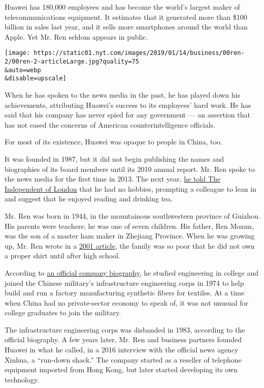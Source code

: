 Huawei has 180,000 employees and has become the world's largest maker of
telecommunications equipment. It estimates that it generated more than
\$100 billion in sales last year, and it sells more smartphones around
the world than Apple. Yet Mr. Ren seldom appears in public.

\texttt{[image: https://static01.nyt.com/images/2019/01/14/business/00ren-2/00ren-2-articleLarge.jpg?quality=75\\\&auto=webp\\\&disable=upscale]}

When he has spoken to the news media in the past, he has played down his
achievements, attributing Huawei's success to its employees' hard work.
He has said that his company has never spied for any government --- an
assertion that has not eased the concerns of American
counterintelligence officials.

For most of its existence, Huawei was opaque to people in China, too.

It was founded in 1987, but it did not begin publishing the names and
biographies of its board members until its 2010 annual report. Mr. Ren
spoke to the news media for the first time in 2013. The next year,
\href{https://www.independent.co.uk/news/business/analysis-and-features/huawei-founder-brushes-off-accusations-that-it-acts-as-an-arm-of-the-chinese-state-9319244.html}{he
told The Independent of London} that he had no hobbies, prompting a
colleague to lean in and suggest that he enjoyed reading and drinking
tea.

Mr. Ren was born in 1944, in the mountainous southwestern province of
Guizhou. His parents were teachers; he was one of seven children. His
father, Ren Moxun, was the son of a master ham maker in Zhejiang
Province. When he was growing up, Mr. Ren wrote in a
\href{http://hx.ahxf.gov.cn/show-53-8069-1.html}{2001 article}, the
family was so poor that he did not own a proper shirt until after high
school.

According to
\href{https://www.huawei.com/cn/about-huawei/executives/board-of-directors/ren-zhengfei}{an
official company biography}, he studied engineering in college and
joined the Chinese military's infrastructure engineering corps in 1974
to help build and run a factory manufacturing synthetic fibers for
textiles. At a time when China had no private-sector economy to speak
of, it was not unusual for college graduates to join the military.

The infrastructure engineering corps was disbanded in 1983, according to
the official biography. A few years later, Mr. Ren and business partners
founded Huawei in what he called, in a 2016 interview with the official
news agency Xinhua, a ``run-down shack.'' The company started as a
reseller of telephone equipment imported from Hong Kong, but later
started developing its own technology.

